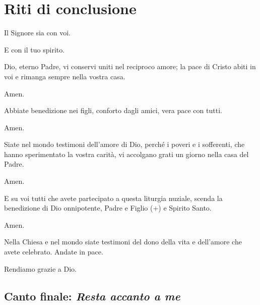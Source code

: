 
\section*{Riti di conclusione}

	\begin{dialoghi}
		\item[\sacerdote] Il Signore sia con voi.
		\item[\assemblea] E con il tuo spirito.
		\item[\sacerdote] Dio, eterno Padre, vi conservi uniti nel reciproco amore; la pace di Cristo abiti in voi e rimanga sempre nella vostra casa.
		\item[\assemblea] Amen.
		\item[\sacerdote] Abbiate benedizione nei figli, conforto dagli amici, vera pace con tutti.
		\item[\assemblea] Amen.
		\item[\sacerdote] Siate nel mondo testimoni dell'amore di Dio, perché i poveri e i sofferenti, che hanno sperimentato la vostra carità, vi accolgano grati un giorno nella casa del Padre.
		\item[\assemblea] Amen.
		\item[\sacerdote] E su voi tutti che avete partecipato a questa liturgia nuziale, scenda la benedizione di Dio onnipotente, Padre e Figlio (+) e Spirito Santo.
		\item[\assemblea] Amen.
		\item[\sacerdote] Nella Chiesa e nel mondo siate testimoni del dono della vita e dell'amore che avete celebrato. Andate in pace.
		\item[\assemblea] Rendiamo grazie a Dio.
	\end{dialoghi}


\subsection*{Canto finale: \textit{Resta accanto a me}}

	\begin{mystrofe}
	\end{mystrofe}

